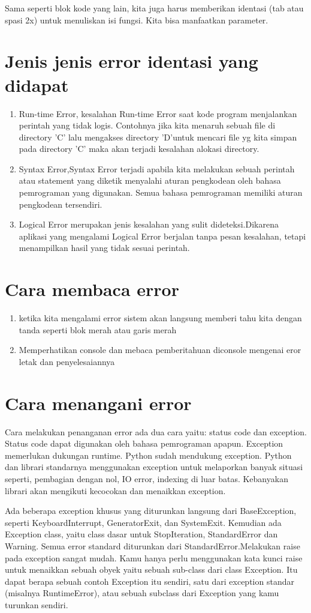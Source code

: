     Sama seperti blok kode yang lain, kita juga harus memberikan identasi (tab atau spasi 2x) untuk menuliskan isi fungsi.
Kita bisa manfaatkan parameter.

\section{Jenis jenis error identasi yang didapat}
\begin{enumerate}
    \item Run-time Error, kesalahan Run-time Error saat  kode program menjalankan perintah yang tidak logis. Contohnya jika kita menaruh sebuah file di directory 'C' lalu mengakses directory 'D'untuk mencari file yg kita simpan pada directory 'C' maka akan terjadi kesalahan alokasi directory.
    \item Syntax Error,Syntax Error terjadi apabila kita melakukan sebuah perintah atau statement yang diketik menyalahi aturan pengkodean oleh bahasa pemrograman yang digunakan. Semua bahasa pemrograman memiliki aturan pengkodean tersendiri.
    \item  Logical Error merupakan jenis kesalahan yang sulit dideteksi.Dikarena aplikasi yang mengalami Logical Error berjalan tanpa pesan kesalahan, tetapi menampilkan hasil yang tidak sesuai perintah.
\end{enumerate}
\section{Cara membaca error}
\begin{enumerate}
    \item ketika kita mengalami error sistem akan langsung memberi tahu kita dengan tanda seperti blok merah atau garis merah
    \item Memperhatikan console dan mebaca pemberitahuan diconsole mengenai eror letak dan penyelesaiannya 
\end{enumerate}
\section{Cara menangani error}
Cara melakukan penanganan error ada dua cara yaitu: status code dan exception. Status code dapat digunakan oleh bahasa pemrograman apapun. Exception memerlukan dukungan runtime. 
Python sudah mendukung exception. Python dan librari standarnya menggunakan exception untuk melaporkan banyak situasi seperti,  pembagian dengan nol, IO error, indexing di luar batas. Kebanyakan librari akan mengikuti kecocokan dan menaikkan exception.


Ada beberapa exception khusus yang diturunkan  langsung dari BaseException, seperti KeyboardInterrupt, GeneratorExit, dan SystemExit. Kemudian ada Exception class, yaitu class dasar untuk StopIteration, StandardError dan Warning. Semua error standard diturunkan dari StandardError.Melakukan raise pada exception sangat mudah. Kamu hanya perlu menggunakan kata kunci raise untuk menaikkan sebuah obyek yaitu sebuah sub-class dari class Exception. Itu dapat berapa sebuah contoh Exception itu sendiri, satu dari exception standar (misalnya RuntimeError), atau sebuah subclass dari Exception yang kamu turunkan sendiri.

 